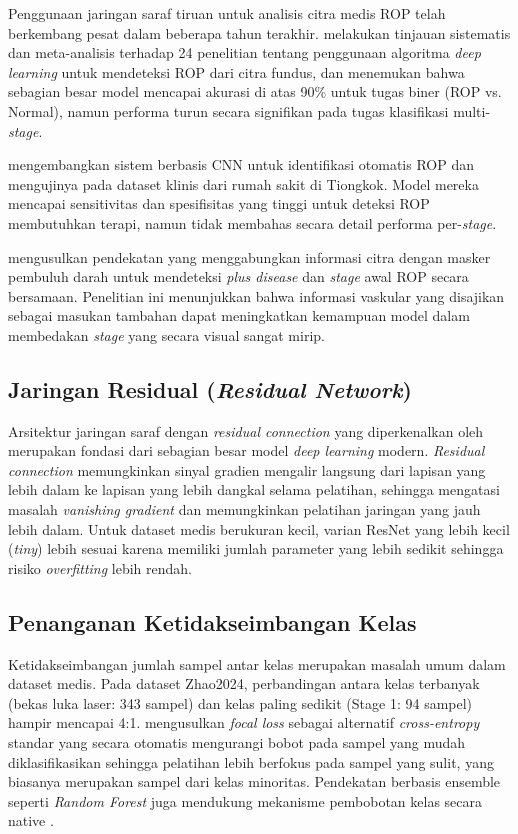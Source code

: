 Penggunaan jaringan saraf tiruan untuk analisis citra medis ROP telah berkembang pesat dalam
beberapa tahun terakhir. \citet{Zhang2021} melakukan tinjauan sistematis dan meta-analisis
terhadap 24 penelitian tentang penggunaan algoritma \textit{deep learning} untuk mendeteksi
ROP dari citra fundus, dan menemukan bahwa sebagian besar model mencapai akurasi di atas 90\%
untuk tugas biner (ROP vs. Normal), namun performa turun secara signifikan pada tugas
klasifikasi multi-\textit{stage}.

\citet{Tong2020} mengembangkan sistem berbasis CNN untuk identifikasi otomatis ROP dan mengujinya
pada dataset klinis dari rumah sakit di Tiongkok. Model mereka mencapai sensitivitas dan
spesifisitas yang tinggi untuk deteksi ROP membutuhkan terapi, namun tidak membahas secara
detail performa per-\textit{stage}.

\citet{Vahidmoghadam2026} mengusulkan pendekatan yang menggabungkan informasi citra dengan
masker pembuluh darah untuk mendeteksi \textit{plus disease} dan \textit{stage} awal ROP secara
bersamaan. Penelitian ini menunjukkan bahwa informasi vaskular yang disajikan sebagai masukan
tambahan dapat meningkatkan kemampuan model dalam membedakan \textit{stage} yang secara visual
sangat mirip.

\subsection{Jaringan Residual (\textit{Residual Network})}

Arsitektur jaringan saraf dengan \textit{residual connection} yang diperkenalkan oleh
\citet{He2016} merupakan fondasi dari sebagian besar model \textit{deep learning} modern.
\textit{Residual connection} memungkinkan sinyal gradien mengalir langsung dari lapisan yang
lebih dalam ke lapisan yang lebih dangkal selama pelatihan, sehingga mengatasi masalah
\textit{vanishing gradient} dan memungkinkan pelatihan jaringan yang jauh lebih dalam. Untuk
dataset medis berukuran kecil, varian ResNet yang lebih kecil (\textit{tiny}) lebih sesuai
karena memiliki jumlah parameter yang lebih sedikit sehingga risiko \textit{overfitting} lebih
rendah.

\subsection{Penanganan Ketidakseimbangan Kelas}

Ketidakseimbangan jumlah sampel antar kelas merupakan masalah umum dalam dataset medis.
Pada dataset Zhao2024, perbandingan antara kelas terbanyak (bekas luka laser: 343 sampel) dan
kelas paling sedikit (Stage 1: 94 sampel) hampir mencapai 4:1. \citet{Lin2017} mengusulkan
\textit{focal loss} sebagai alternatif \textit{cross-entropy} standar yang secara otomatis
mengurangi bobot pada sampel yang mudah diklasifikasikan sehingga pelatihan lebih berfokus pada
sampel yang sulit, yang biasanya merupakan sampel dari kelas minoritas. Pendekatan berbasis
ensemble seperti \textit{Random Forest} juga mendukung mekanisme pembobotan kelas secara
native \citep{Breiman2001}.


